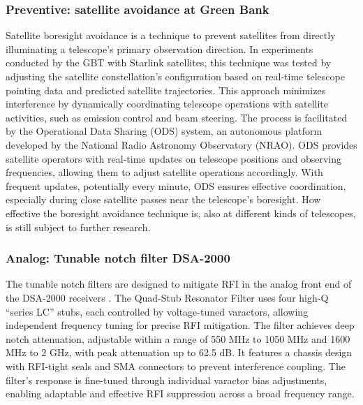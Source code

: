 \subsubsection{Preventive: satellite avoidance at Green Bank}
\label{subsubsec:avoidance}
Satellite boresight avoidance is a technique to prevent satellites from directly illuminating a telescope's primary observation direction. In experiments conducted by the GBT with Starlink satellites, this technique was tested \citep{nhan2024spectrumcoexistencedemonstrationeffectiveness} by adjusting the satellite constellation's configuration based on real-time telescope pointing data and predicted satellite trajectories. This approach minimizes interference by dynamically coordinating telescope operations with satellite activities, such as emission control and beam steering. The process is facilitated by the Operational Data Sharing (ODS) system, an autonomous platform developed by the National Radio Astronomy Observatory (NRAO). ODS provides satellite operators with real-time updates on telescope positions and observing frequencies, allowing them to adjust satellite operations accordingly. With frequent updates, potentially every minute, ODS ensures effective coordination, especially during close satellite passes near the telescope’s boresight. How effective the boresight avoidance technique is, also at different kinds of telescopes, is still subject to further research. 

\subsubsection{Analog: Tunable notch filter DSA-2000}

The tunable notch filters are designed to mitigate RFI in the analog front end of the DSA-2000 receivers \citep{hellbourg2024assessing}. The Quad-Stub Resonator Filter uses four high-Q “series LC” stubs, each controlled by voltage-tuned varactors, allowing independent frequency tuning for precise RFI mitigation. The filter achieves deep notch attenuation, adjustable within a range of 550 MHz to 1050 MHz and 1600 MHz to 2 GHz, with peak attenuation up to 62.5 dB. It features a chassis design with RFI-tight seals and SMA connectors to prevent interference coupling. The filter's response is fine-tuned through individual varactor bias adjustments, enabling adaptable and effective RFI suppression across a broad frequency range.

